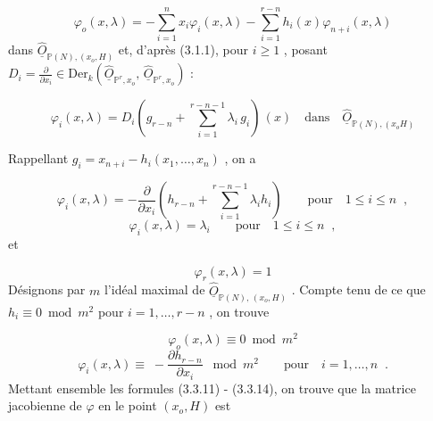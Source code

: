 \begin{equation}\tag{3.3.8}
\varphi_o(x,\lambda)= - \sum_{i=1}^{n} x_i\varphi_i(x,\lambda)- \sum_{i=1}^{r-n} h_i(x)\varphi_{n+i}(x,\lambda)
\end{equation}
dans $\hat{\underline{O}}_{\mathbb{P}(N),(x_o,H)}$ et, d'après (3.1.1), pour $i \geq 1$ , posant $D_i = \frac{\partial}{\partial x_i} \in \mathrm{Der}_k(\hat{\underline{O}}_{\mathbb{P}^r,x_o},\, \hat{\underline{O}}_{\mathbb{P}^r,x_o})$ :

\begin{equation}\tag{3.3.9}
\varphi_i(x,\lambda) = D_i(g_{r-n}+ \sum_{i=1}^{r-n-1} \lambda_i\, g_i)\, (x) \quad \mbox{dans} \quad \hat{\underline{O}}_{\mathbb{P}(N),(x_o H)}
\end{equation}


Rappellant  $g_i = x_{n+i} - h_i(x_1,\dots,x_n)$  , on a

\begin{equation}\tag{3.3.10}
\varphi_i(x,\lambda)= -\frac{\partial}{\partial x_i}\left(h_{r-n} + \sum_{i=1}^{r-n-1} \lambda_i h_i\right) \qquad \mbox{pour} \quad 1 \leq i \leq n \;\; ,
\end{equation}
\begin{equation}\tag{3.3.11}
\varphi_i(x,\lambda) = \lambda_i \qquad \mbox{pour} \quad 1 \leq i \leq n \;\; ,
\end{equation}
et

\begin{equation}\tag{3.3.12}
\varphi_r(x,\lambda) = 1
\end{equation}
Désignons par  $m$  l'idéal maximal de  $\hat{\underline{O}}_{\mathbb{P}(N),\,(x_o,H)}$  . Compte tenu de ce que  $h_i \equiv 0 \bmod m^2$  pour  $i = 1,\dots,r-n$  , on trouve

\begin{equation}\tag{3.3.13}
\varphi_o(x,\lambda) \equiv 0 \bmod m^2
\end{equation}
\begin{equation}\tag{3.3.14}
\varphi_i(x,\lambda) \equiv \; -\frac{\partial h_{r-n}}{\partial x_i} \; \bmod m^2 \qquad \mbox{pour} \quad i=1,\dots,n \;\; .
\end{equation}
Mettant ensemble les formules (3.3.11) - (3.3.14), on trouve que la matrice jacobienne de  $\varphi$ en le point  $(x_o,H)$  est 



